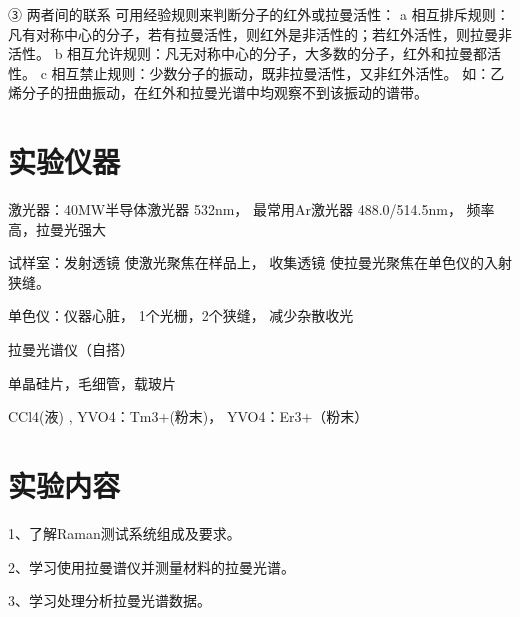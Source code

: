 \documentclass{article}
\begin{document}
③ 两者间的联系
    可用经验规则来判断分子的红外或拉曼活性：
a 相互排斥规则：凡有对称中心的分子，若有拉曼活性，则红外是非活性的；若红外活性，则拉曼非活性。
b 相互允许规则：凡无对称中心的分子，大多数的分子，红外和拉曼都活性。
c 相互禁止规则：少数分子的振动，既非拉曼活性，又非红外活性。
   如：乙烯分子的扭曲振动，在红外和拉曼光谱中均观察不到该振动的谱带。

\section{实验仪器}
激光器：40MW半导体激光器   532nm，
最常用Ar激光器   488.0/514.5nm，
频率高，拉曼光强大


试样室：发射透镜
   使激光聚焦在样品上，
收集透镜
   使拉曼光聚焦在单色仪的入射狭缝。
   
   
单色仪：仪器心脏，
1个光栅，2个狭缝，
减少杂散收光


拉曼光谱仪（自搭）



单晶硅片，毛细管，载玻片



CCl4(液) , YVO4：Tm3+(粉末)， YVO4：Er3+（粉末）


\section{实验内容}
1、了解Raman测试系统组成及要求。


2、学习使用拉曼谱仪并测量材料的拉曼光谱。


3、学习处理分析拉曼光谱数据。
\end{document}
